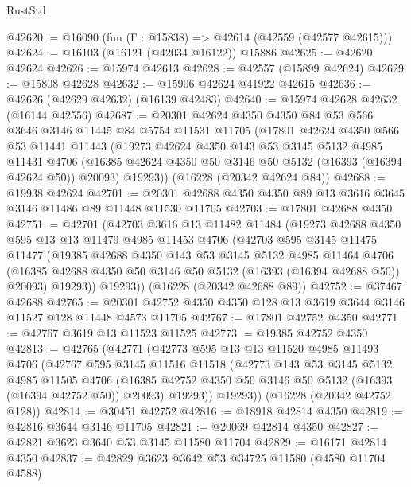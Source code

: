 \begin{lexlean}{RustStd}
\begin{coremodule}
@42620 := @16090 (fun (Γ : @15838) => @42614 (@42559 (@42577 @42615)))
@42624 := @16103 (@16121 (@42034 @16122)) @15886
@42625 := @42620 @42624
@42626 := @15974 @42613
@42628 := @42557 (@15899 @42624)
@42629 := @15808 @42628
@42632 := @15906 @42624 @41922 @42615
@42636 := @42626 (@42629 @42632) (@16139 @42483)
@42640 := @15974 @42628 @42632 (@16144 @42556)
@42687 := @20301
    @42624
    @4350
    @4350
    @84
    @53
    @566
    @3646
    @3146
    @11445
    @84
    @5754
    @11531
    @11705
    (@17801
      @42624
      @4350
      @566
      @53
      @11441
      @11443
      (@19273
        @42624
        @4350
        @143
        @53
        @3145
        @5132
        @4985
        @11431
        @4706
        (@16385 @42624 @4350 @50 @3146 @50 @5132 (@16393 (@16394 @42624 @50)) @20093)
        @19293))
    (@16228 (@20342 @42624 @84))
@42688 := @19938 @42624
@42701 := @20301 @42688 @4350 @4350 @89 @13 @3616 @3645 @3146 @11486 @89 @11448 @11530 @11705
@42703 := @17801 @42688 @4350
@42751 := @42701
    (@42703
      @3616
      @13
      @11482
      @11484
      (@19273
        @42688
        @4350
        @595
        @13
        @13
        @11479
        @4985
        @11453
        @4706
        (@42703
          @595
          @3145
          @11475
          @11477
          (@19385
            @42688
            @4350
            @143
            @53
            @3145
            @5132
            @4985
            @11464
            @4706
            (@16385 @42688 @4350 @50 @3146 @50 @5132 (@16393 (@16394 @42688 @50)) @20093)
            @19293))
        @19293))
    (@16228 (@20342 @42688 @89))
@42752 := @37467 @42688
@42765 := @20301 @42752 @4350 @4350 @128 @13 @3619 @3644 @3146 @11527 @128 @11448 @4573 @11705
@42767 := @17801 @42752 @4350
@42771 := @42767 @3619 @13 @11523 @11525
@42773 := @19385 @42752 @4350
@42813 := @42765
    (@42771
      (@42773
        @595
        @13
        @13
        @11520
        @4985
        @11493
        @4706
        (@42767
          @595
          @3145
          @11516
          @11518
          (@42773
            @143
            @53
            @3145
            @5132
            @4985
            @11505
            @4706
            (@16385 @42752 @4350 @50 @3146 @50 @5132 (@16393 (@16394 @42752 @50)) @20093)
            @19293))
        @19293))
    (@16228 (@20342 @42752 @128))
@42814 := @30451 @42752
@42816 := @18918 @42814 @4350
@42819 := @42816 @3644 @3146 @11705
@42821 := @20069 @42814 @4350
@42827 := @42821 @3623 @3640 @53 @3145 @11580 @11704
@42829 := @16171 @42814 @4350
@42837 := @42829 @3623 @3642 @53 @34725 @11580 (@4580 @11704 @4588)

\end{coremodule}
\end{lexlean}
